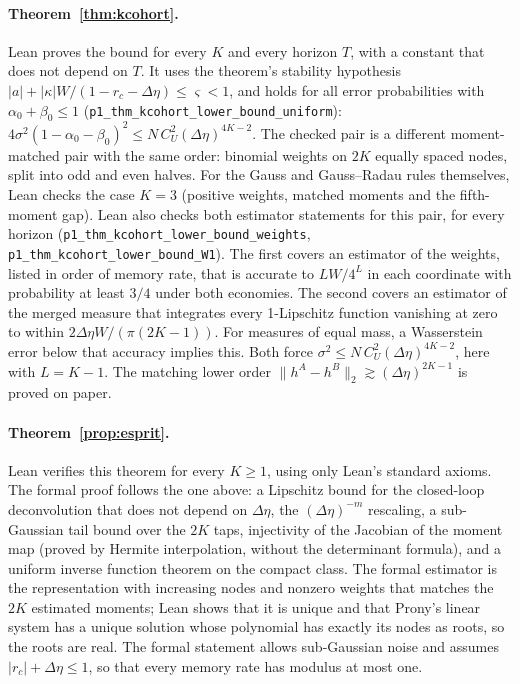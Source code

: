 \documentclass[12pt]{article}
\theoremstyle{definition}
\theoremstyle{remark}
\begin{document}
\paragraph{Theorem~\ref{thm:kcohort}.}
Lean proves the bound for every $K$ and every horizon $T$, with a constant that does not depend on $T$. It uses the theorem's stability hypothesis $|a|+|\kappa|W/(1-r_c-\Delta\eta)\le\varsigma<1$, and holds for all error probabilities with $\alpha_0+\beta_0\le1$ (\nolinkurl{p1_thm_kcohort_lower_bound_uniform}): $4\sigma^2(1-\alpha_0-\beta_0)^2\le N\,C_U^2(\Delta\eta)^{4K-2}$. The checked pair is a different moment-matched pair with the same order: binomial weights on $2K$ equally spaced nodes, split into odd and even halves. For the Gauss and Gauss--Radau rules themselves, Lean checks the case $K=3$ (positive weights, matched moments and the fifth-moment gap). Lean also checks both estimator statements for this pair, for every horizon (\nolinkurl{p1_thm_kcohort_lower_bound_weights}, \nolinkurl{p1_thm_kcohort_lower_bound_W1}). The first covers an estimator of the weights, listed in order of memory rate, that is accurate to $LW/4^L$ in each coordinate with probability at least $3/4$ under both economies. The second covers an estimator of the merged measure that integrates every 1-Lipschitz function vanishing at zero to within $2\Delta\eta W/(\pi(2K-1))$. For measures of equal mass, a Wasserstein error below that accuracy implies this. Both force $\sigma^2\le N\,C_U^2(\Delta\eta)^{4K-2}$, here with $L=K-1$. The matching lower order $\|h^A-h^B\|_2\gtrsim(\Delta\eta)^{2K-1}$ is proved on paper.

\paragraph{Theorem~\ref{prop:esprit}.}
Lean verifies this theorem for every $K\ge1$, using only Lean's standard axioms. The formal proof follows the one above: a Lipschitz bound for the closed-loop deconvolution that does not depend on $\Delta\eta$, the $(\Delta\eta)^{-m}$ rescaling, a sub-Gaussian tail bound over the $2K$ taps, injectivity of the Jacobian of the moment map (proved by Hermite interpolation, without the determinant formula), and a uniform inverse function theorem on the compact class. The formal estimator is the representation with increasing nodes and nonzero weights that matches the $2K$ estimated moments; Lean shows that it is unique and that Prony's linear system has a unique solution whose polynomial has exactly its nodes as roots, so the roots are real. The formal statement allows sub-Gaussian noise and assumes $|r_c|+\Delta\eta\le1$, so that every memory rate has modulus at most one.
\end{document}
